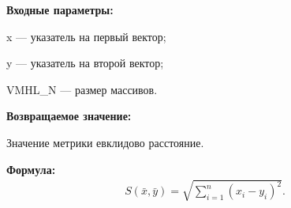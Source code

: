 \textbf{Входные параметры:}
 
x --- указатель на первый вектор;
 
y --- указатель на второй вектор;
 
VMHL\_N --- размер массивов.

\textbf{Возвращаемое значение:}
 
 Значение метрики евклидово расстояние.

\textbf{Формула:}
\begin{eqnarray*}
S\left( \bar{x}, \bar{y}\right)=\sqrt{\sum_{i=1}^n {\left( x_i-y_i \right)}^2}   .
\end{eqnarray*}